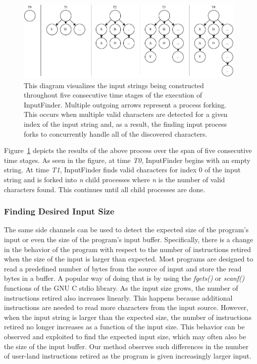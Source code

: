 \documentclass{acm_proc_article-sp}
\def \tool {InputFinder}
\begin{document}
\begin{figure}[t]
\centering
\includegraphics[width=\textwidth]{string_builder.pdf}
\caption{This diagram visualizes the input strings being constructed throughout five consecutive time stages of the execution of 
\tool{}. Multiple outgoing arrows represent a process forking. This occurs when multiple valid characters are detected for a given index of the input string and, as a result, the finding input process forks to concurrently handle all of the discovered characters.}
\label{fig:string_builder}
\end{figure}

Figure~\ref{fig:string_builder} depicts the results of the above process over the span of five consecutive time stages.
As seen in the figure, at time \textit{T0}, \tool{} begins with an empty string.
At time \textit{T1}, \tool{} finds valid characters for index 0 of the input string and is forked into \textit{n} child processes where \textit{n} is the number of valid characters found.
This continues until all child processes are done.

\subsubsection{Finding Desired Input Size}
The same side channels can be used to detect the expected size of the program's input or even the size of the program's input buffer.
Specifically, there is a change in the behavior of the program with respect to the number of instructions retired when the size of the input is larger than expected.
Most programs are designed to read a predefined number of bytes from the source of input and store the read bytes in a buffer.
A popular way of doing that is by using the \textit{fgets()} or \textit{scanf()} functions of the GNU C stdio library.
As the input size grows, the number of instructions retired also increases linearly.
This happens because additional instructions are needed to read more characters from the input source.
However, when the input string is larger than the expected size, the number of instructions retired no longer increases as a function of the input size.
This behavior can be observed and exploited to find the expected input size, which may often also be the size of the input buffer.
Our method observes such differences in the number of user-land instructions retired as the program is given increasingly larger input.
\end{document}
